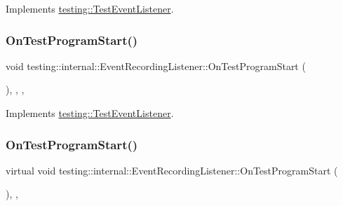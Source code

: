 Implements \mbox{\hyperlink{classtesting_1_1_test_event_listener_a5f6c84f39851e8a603a2d2e10063816b}{testing\+::\+Test\+Event\+Listener}}.

\mbox{\label{classtesting_1_1internal_1_1_event_recording_listener_a9cec5ac263fe161de360615422370eec}} 
\subsubsection{\texorpdfstring{OnTestProgramStart()}{OnTestProgramStart()}\hspace{0.1cm}{\footnotesize\ttfamily [2/3]}}
{\footnotesize\ttfamily void testing\+::internal\+::\+Event\+Recording\+Listener\+::\+On\+Test\+Program\+Start (\begin{DoxyParamCaption}\item[{const \mbox{\hyperlink{classtesting_1_1_unit_test}{Unit\+Test}} \&}]{ }\end{DoxyParamCaption})\hspace{0.3cm}{\ttfamily [inline]}, {\ttfamily [override]}, {\ttfamily [protected]}, {\ttfamily [virtual]}}



Implements \mbox{\hyperlink{classtesting_1_1_test_event_listener_a5f6c84f39851e8a603a2d2e10063816b}{testing\+::\+Test\+Event\+Listener}}.

\mbox{\label{classtesting_1_1internal_1_1_event_recording_listener_aff89fdd3ae889a54a2ba2f3d4c98d3f6}} 
\subsubsection{\texorpdfstring{OnTestProgramStart()}{OnTestProgramStart()}\hspace{0.1cm}{\footnotesize\ttfamily [3/3]}}
{\footnotesize\ttfamily virtual void testing\+::internal\+::\+Event\+Recording\+Listener\+::\+On\+Test\+Program\+Start (\begin{DoxyParamCaption}\item[{const \mbox{\hyperlink{classtesting_1_1_unit_test}{Unit\+Test}} \&}]{ }\end{DoxyParamCaption})\hspace{0.3cm}{\ttfamily [inline]}, {\ttfamily [protected]}, {\ttfamily [virtual]}}



